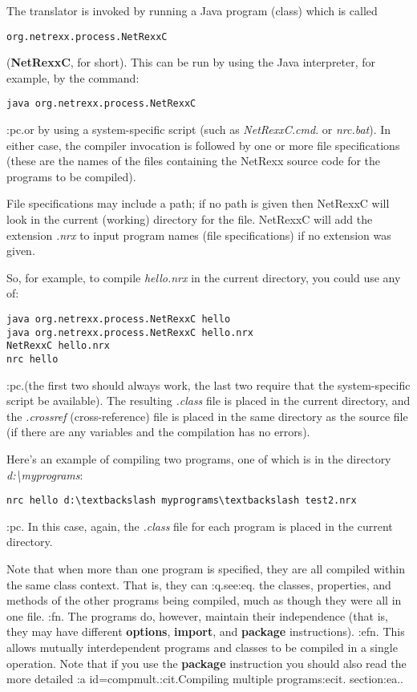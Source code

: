 The translator is invoked by running a Java program (class) which is
called 
\begin{verbatim}
org.netrexx.process.NetRexxC
\end{verbatim}  
(\textbf{NetRexxC}, for short). This can be run by using the Java interpreter, for example,
by the command:
\begin{verbatim}
java org.netrexx.process.NetRexxC
\end{verbatim}
:pc.or by using a system-specific script (such as \emph{NetRexxC.cmd}.
or \emph{nrc.bat}).  In either case, the compiler invocation is followed
by one or more file specifications (these are the names of the files
containing the NetRexx source code for the programs to be compiled).

File specifications may include a path; if no path is given then
NetRexxC will look in the current (working) directory for the file.
NetRexxC will add the extension \emph{.nrx} to input program names (file
specifications) if no extension was given.

So, for example, to compile \emph{hello.nrx} in the current directory,
you could use any of:
\begin{verbatim}
java org.netrexx.process.NetRexxC hello
java org.netrexx.process.NetRexxC hello.nrx
NetRexxC hello.nrx
nrc hello
\end{verbatim}
:pc.(the first two should always work, the last two require that the
system-specific script be available).  The resulting \emph{.class} file
is placed in the current directory, and the \emph{.crossref}
(cross-reference) file is placed in the same directory as the source
file (if there are any variables and the compilation has no errors).

Here's an example of compiling two programs, one of which is in the
directory \emph{d:\textbackslash myprograms}:
\begin{verbatim}
nrc hello d:\textbackslash myprograms\textbackslash test2.nrx
\end{verbatim}
:pc.
In this case, again, the \emph{.class} file for each program is placed
in the current directory.

Note that when more than one program is specified, they are all compiled
within the same class context.  That is, they can :q.see:eq. the
classes, properties, and methods of the other programs being compiled,
much as though they were all in one file.
:fn.
The programs do, however, maintain their independence (that is, they may
have different \textbf{options}, \textbf{import}, and \textbf{package}
instructions).
:efn.
This allows mutually interdependent programs and classes to be compiled
in a single operation.
Note that if you use the \textbf{package} instruction you should also
read the more detailed :a id=compmult.:cit.Compiling multiple
programs:ecit. section:ea..

